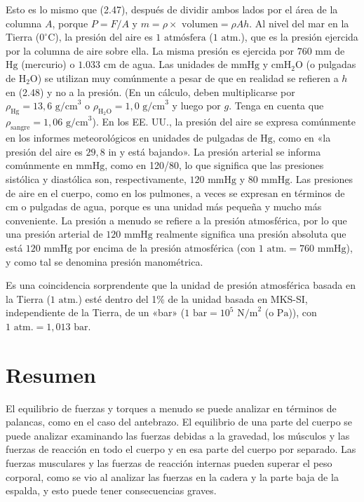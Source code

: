 \documentclass[12pt]{book}
\begin{document}
Esto es lo mismo que (2.47), después de dividir ambos lados por el área de la columna $A$, porque $P = F/A$ y $m = \rho \times\text{ volumen} = \rho A h$. Al nivel del mar en la Tierra ($0^\circ\text{C}$), la presión del aire es $1\text{ atmósfera}$ ($1\text{ atm.}$), que es la presión ejercida por la columna de aire sobre ella. La misma presión es ejercida por $760\text{ mm}$ de $\text{Hg}$ (mercurio) o $1.033\text{ cm}$ de agua. Las unidades de $\text{mmHg}$ y $\text{cmH}_2\text{O}$ (o pulgadas de $\text{H}_2\text{O}$) se utilizan muy comúnmente a pesar de que en realidad se refieren a $h$ en (2.48) y no a la presión. (En un cálculo, deben multiplicarse por $\rho_{\text{Hg}} = 13,6\text{ g/cm}^3$ o $\rho_{\text{H}_2\text{O}} = 1,0\text{ g/cm}^3$ y luego por $g$. Tenga en cuenta que $\rho_{\text{sangre}} = 1,06\text{ g/cm}^3$). En los EE. UU., la presión del aire se expresa comúnmente en los informes meteorológicos en unidades de pulgadas de $\text{Hg}$, como en «la presión del aire es $29,8\text{ in}$ y está bajando». La presión arterial se informa comúnmente en $\text{mmHg}$, como en 120/80, lo que significa que las presiones sistólica y diastólica son, respectivamente, $120\text{ mmHg}$ y $80\text{ mmHg}$. Las presiones de aire en el cuerpo, como en los pulmones, a veces se expresan en términos de $\text{cm}$ o pulgadas de agua, porque es una unidad más pequeña y mucho más conveniente. La presión a menudo se refiere a la presión atmosférica, por lo que una presión arterial de $120\text{ mmHg}$ realmente significa una presión absoluta que está $120\text{ mmHg}$ por encima de la presión atmosférica (con $1\text{ atm.} = 760\text{ mmHg}$), y como tal se denomina presión manométrica.

Es una coincidencia sorprendente que la unidad de presión atmosférica basada en la Tierra ($1\text{ atm.}$) esté dentro del 1\% de la unidad basada en MKS-SI, independiente de la Tierra, de un «bar» ($1\text{ bar} = 10^5\text{ N/m}^2$ (o $\text{Pa}$)), con $1\text{ atm.} = 1,013\text{ bar}$.

\section{Resumen}

El equilibrio de fuerzas y torques a menudo se puede analizar en términos de palancas, como en el caso del antebrazo. El equilibrio de una parte del cuerpo se puede analizar examinando las fuerzas debidas a la gravedad, los músculos y las fuerzas de reacción en todo el cuerpo y en esa parte del cuerpo por separado. Las fuerzas musculares y las fuerzas de reacción internas pueden superar el peso corporal, como se vio al analizar las fuerzas en la cadera y la parte baja de la espalda, y esto puede tener consecuencias graves.
\end{document}

